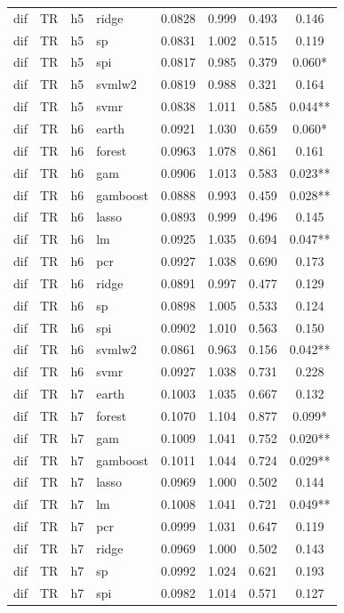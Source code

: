 \begin{ThreePartTable}
\begin{longtable}[t]{llclcccc}
dif & TR & h5 & ridge & 0.0828 & 0.999 & 0.493 & 0.146\\
dif & TR & h5 & sp & 0.0831 & 1.002 & 0.515 & 0.119\\
dif & TR & h5 & spi & 0.0817 & 0.985 & 0.379 & 0.060*\\
dif & TR & h5 & svmlw2 & 0.0819 & 0.988 & 0.321 & 0.164\\
dif & TR & h5 & svmr & 0.0838 & 1.011 & 0.585 & 0.044**\\
\addlinespace
dif & TR & h6 & earth & 0.0921 & 1.030 & 0.659 & 0.060*\\
dif & TR & h6 & forest & 0.0963 & 1.078 & 0.861 & 0.161\\
dif & TR & h6 & gam & 0.0906 & 1.013 & 0.583 & 0.023**\\
dif & TR & h6 & gamboost & 0.0888 & 0.993 & 0.459 & 0.028**\\
dif & TR & h6 & lasso & 0.0893 & 0.999 & 0.496 & 0.145\\
dif & TR & h6 & lm & 0.0925 & 1.035 & 0.694 & 0.047**\\
dif & TR & h6 & pcr & 0.0927 & 1.038 & 0.690 & 0.173\\
dif & TR & h6 & ridge & 0.0891 & 0.997 & 0.477 & 0.129\\
dif & TR & h6 & sp & 0.0898 & 1.005 & 0.533 & 0.124\\
dif & TR & h6 & spi & 0.0902 & 1.010 & 0.563 & 0.150\\
dif & TR & h6 & svmlw2 & 0.0861 & 0.963 & 0.156 & 0.042**\\
dif & TR & h6 & svmr & 0.0927 & 1.038 & 0.731 & 0.228\\
\addlinespace
dif & TR & h7 & earth & 0.1003 & 1.035 & 0.667 & 0.132\\
dif & TR & h7 & forest & 0.1070 & 1.104 & 0.877 & 0.099*\\
dif & TR & h7 & gam & 0.1009 & 1.041 & 0.752 & 0.020**\\
dif & TR & h7 & gamboost & 0.1011 & 1.044 & 0.724 & 0.029**\\
dif & TR & h7 & lasso & 0.0969 & 1.000 & 0.502 & 0.144\\
dif & TR & h7 & lm & 0.1008 & 1.041 & 0.721 & 0.049**\\
dif & TR & h7 & pcr & 0.0999 & 1.031 & 0.647 & 0.119\\
dif & TR & h7 & ridge & 0.0969 & 1.000 & 0.502 & 0.143\\
dif & TR & h7 & sp & 0.0992 & 1.024 & 0.621 & 0.193\\
dif & TR & h7 & spi & 0.0982 & 1.014 & 0.571 & 0.127\\

\end{longtable}
\end{ThreePartTable}
